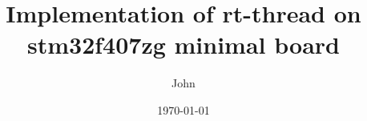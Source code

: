 \documentclass{article}
\title{Implementation of rt-thread on stm32f407zg minimal board}
\author{John}
\date{\today}
\begin{document}
\
\end{document}
